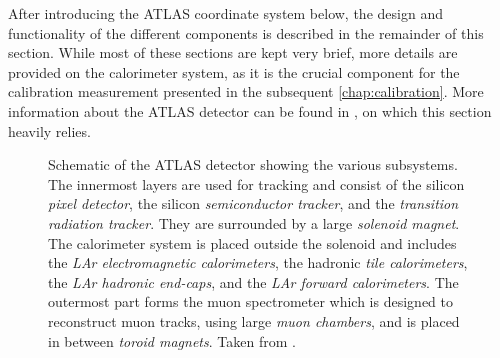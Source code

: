 After introducing the ATLAS coordinate system below, the design and functionality of the different components is described in the remainder of this section.
While most of these sections are kept very brief, more details are provided on the calorimeter system, as it is the crucial component for the calibration measurement presented in the subsequent \cref{chap:calibration}.
More information about the ATLAS detector can be found in , on which this section heavily relies.


\begin{landscape}
    \begin{figure}
    \caption[Schematic of the ATLAS detector showing the various subsystems.]{Schematic of the ATLAS detector showing the various subsystems.
        The innermost layers are used for tracking and consist of the silicon \emph{pixel detector}, the silicon \emph{semiconductor tracker}, and the \emph{transition radiation tracker}.
        They are surrounded by a large \emph{solenoid magnet}.
        The calorimeter system is placed outside the solenoid and includes the \emph{LAr electromagnetic calorimeters}, the hadronic \emph{tile calorimeters}, the \emph{LAr hadronic end-caps}, and the \emph{LAr forward calorimeters}.
        The outermost part forms the muon spectrometer which is designed to reconstruct muon tracks, using large \emph{muon chambers}, and is placed in between \emph{toroid magnets}. Taken from .}
    \label{fig:ATLASlayout}
    \end{figure}
\end{landscape}

